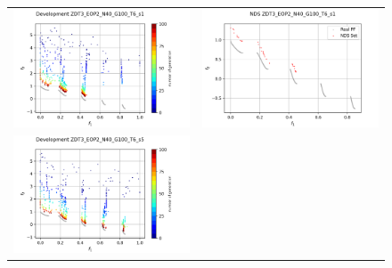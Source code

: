 \begin{figure}[H]
    \centering
    \begin{tabular}{c c}
    \includegraphics[scale=0.5]{figures/ZDT3_EOP2_N40_G100_T6/s1_dev.png} &
    \includegraphics[scale=0.5]{figures/ZDT3_EOP2_N40_G100_T6/s1_nds.png}\\
    \includegraphics[scale=0.5]{figures/ZDT3_EOP2_N40_G100_T6/s5_dev.png} &

\end{tabular}
\end{figure}

